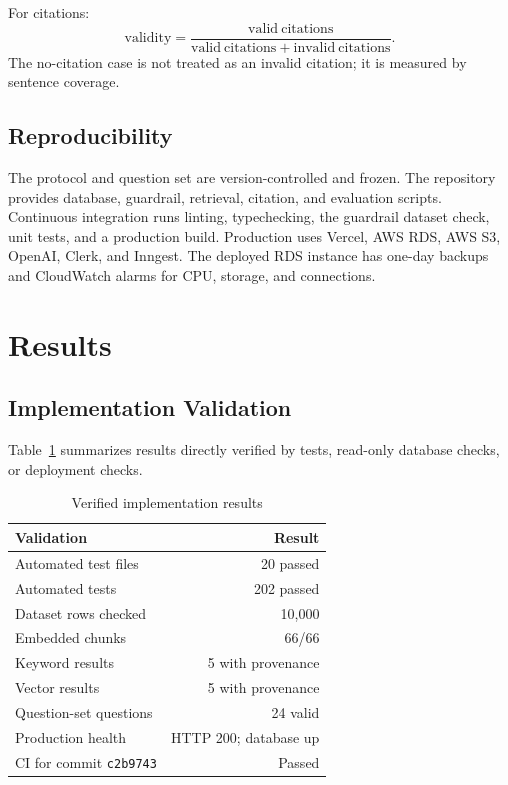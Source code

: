 \documentclass[conference]{IEEEtran}
\begin{document}
For citations:
\begin{equation}
\mathrm{validity} =
\frac{\mathrm{valid\ citations}}
{\mathrm{valid\ citations}+\mathrm{invalid\ citations}}.
\end{equation}
The no-citation case is not treated as an invalid citation; it is measured by
sentence coverage.

\subsection{Reproducibility}
The protocol and question set are version-controlled and frozen. The
repository provides database, guardrail, retrieval, citation, and evaluation
scripts. Continuous integration runs linting, typechecking, the guardrail
dataset check, unit tests, and a production build. Production uses Vercel,
AWS RDS, AWS S3, OpenAI, Clerk, and Inngest. The deployed RDS instance has
one-day backups and CloudWatch alarms for CPU, storage, and connections.

\section{Results}
\subsection{Implementation Validation}
Table~\ref{tab:validation} summarizes results directly verified by tests,
read-only database checks, or deployment checks.

\begin{table}[t]
\caption{Verified implementation results}
\label{tab:validation}
\centering
\footnotesize
\begin{tabular}{p{}r}
\toprule
Validation & Result\\
\midrule
Automated test files & 20 passed\\
Automated tests & 202 passed\\
Dataset rows checked & 10,000\\
Embedded chunks & 66/66\\
Keyword results & 5 with provenance\\
Vector results & 5 with provenance\\
Question-set questions & 24 valid\\
Production health & HTTP 200; database up\\
CI for commit \texttt{c2b9743} & Passed\\
\bottomrule
\end{tabular}
\end{table}
\end{document}
